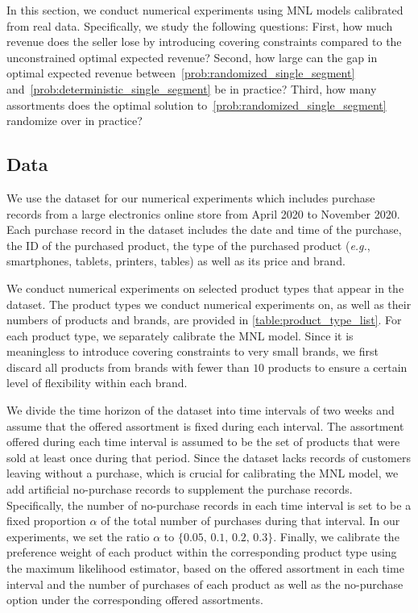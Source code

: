 \documentclass[msom,non-blindrev]{informs3} %
\theoremstyle{definition}
\newcommand{\eg}{\textit{e.g.}}
\begin{document}
In this section, we conduct numerical experiments using MNL models calibrated from real data. Specifically, we study the following questions: First, how much revenue does the seller lose by introducing covering constraints compared to the unconstrained optimal expected revenue? Second, how large can the gap in optimal expected revenue between~\eqref{prob:randomized_single_segment} and~\eqref{prob:deterministic_single_segment} be in practice? Third, how many assortments does the optimal solution to~\eqref{prob:randomized_single_segment} randomize over in practice?




\subsection{Data}
We use the dataset \cite{ECommerceData} for our numerical experiments which includes purchase records from a large electronics online store from April 2020 to November 2020. Each purchase record in the dataset includes the date and time of the purchase, the ID of the purchased product, the type of the purchased product (\eg, smartphones, tablets, printers, tables) as well as its price and brand.

We conduct numerical experiments on selected product types that appear in the dataset. The product types we conduct numerical experiments on, as well as their numbers of products and brands, are provided in \cref{table:product_type_list}. For each product type, we separately calibrate the MNL model. Since it is meaningless to introduce covering constraints to very small brands, we first discard all products from brands with fewer than $10$ products to ensure a certain level of flexibility within each brand.

We divide the time horizon of the dataset into time intervals of two weeks and assume that the offered assortment is fixed during each interval. The assortment offered during each time interval is assumed to be the set of products that were sold at least once during that period. Since the dataset lacks records of customers leaving without a purchase, which is crucial for calibrating the MNL model, we add artificial no-purchase records to supplement the purchase records. Specifically, the number of no-purchase records in each time interval is set to be a fixed proportion $\alpha$ of the total number of purchases during that interval. In our experiments, we set the ratio $\alpha$ to $\{0.05,\,0.1,\,0.2,\,0.3\}$. Finally, we calibrate the preference weight of each product within the corresponding product type using the maximum likelihood estimator, based on the offered assortment in each time interval and the number of purchases of each product as well as the no-purchase option under the corresponding offered assortments.
\end{document}
